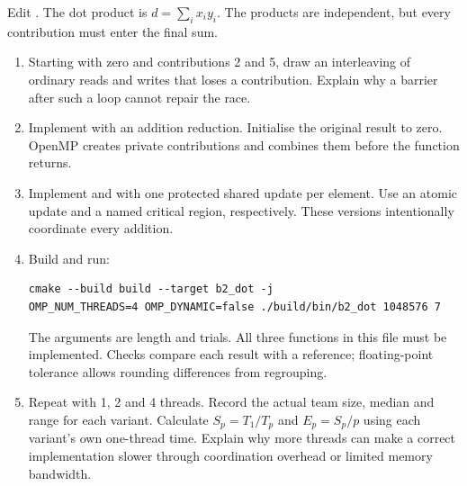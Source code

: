 Edit . The dot product is $d=\sum_i x_i y_i$.
The products are independent, but every contribution must enter the final sum.
\begin{enumerate}
\item Starting with zero and contributions 2 and 5, draw an interleaving of
ordinary reads and writes that loses a contribution. Explain why a barrier
after such a loop cannot repair the race.
\item Implement  with an addition reduction. Initialise
the original result to zero. OpenMP creates private contributions and combines
them before the function returns.
\item Implement  and  with one protected
shared update per element. Use an atomic update and a named critical region,
respectively. These versions intentionally coordinate every addition.
\item Build and run:
\begin{lstlisting}[style=shell]
cmake --build build --target b2_dot -j
OMP_NUM_THREADS=4 OMP_DYNAMIC=false ./build/bin/b2_dot 1048576 7
\end{lstlisting}
The arguments are length and trials. All three functions in this file must be
implemented. Checks compare each result with a reference; floating-point tolerance
allows rounding differences from regrouping.
\item Repeat with 1, 2 and 4 threads. Record the actual team size, median and
range for each variant. Calculate $S_p=T_1/T_p$ and $E_p=S_p/p$ using each
variant's own one-thread time. Explain why more threads can make a correct
implementation slower through coordination overhead or limited memory bandwidth.
\end{enumerate}

